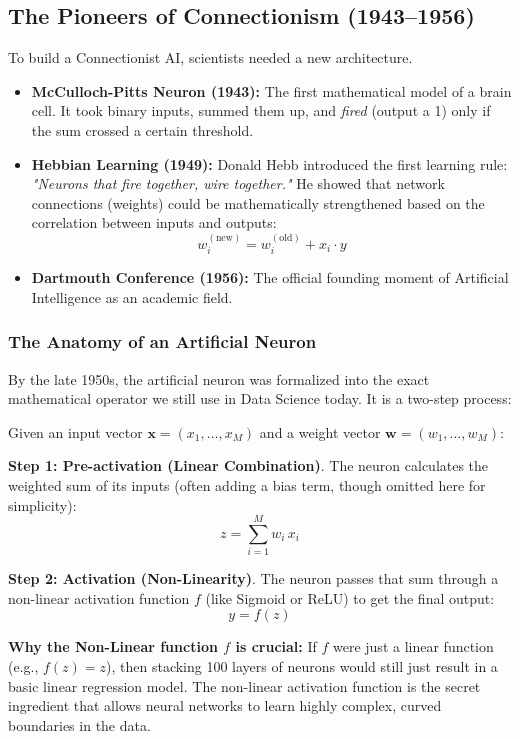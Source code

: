 \documentclass[11pt]{article}
\theoremstyle{smallexample}
\begin{document}
\subsection{The Pioneers of Connectionism (1943--1956)}
To build a Connectionist AI, scientists needed a new architecture.
\begin{itemize}
    \item \textbf{McCulloch-Pitts Neuron (1943):} The first mathematical model of a brain cell. It took binary inputs, summed them up, and \textit{fired} (output a 1) only if the sum crossed a certain threshold.
    \item \textbf{Hebbian Learning (1949):} Donald Hebb introduced the first learning rule: \textit{"Neurons that fire together, wire together."} He showed that network connections (weights) could be mathematically strengthened based on the correlation between inputs and outputs: 
    $$w_i^{(\text{new})} = w_i^{(\text{old})} + x_i \cdot y$$
    \item \textbf{Dartmouth Conference (1956):} The official founding moment of Artificial Intelligence as an academic field.
\end{itemize}

\subsubsection{The Anatomy of an Artificial Neuron}
By the late 1950s, the artificial neuron was formalized into the exact mathematical operator we still use in Data Science today. It is a two-step process:

Given an input vector $\mathbf{x} = (x_1, \dots, x_M)$ and a weight vector $\mathbf{w} = (w_1, \dots, w_M)$:

\textbf{Step 1: Pre-activation (Linear Combination)}.
The neuron calculates the weighted sum of its inputs (often adding a bias term, though omitted here for simplicity):
\begin{equation}
z = \sum_{i=1}^{M} w_i \, x_i
\end{equation}





\textbf{Step 2: Activation (Non-Linearity)}.
The neuron passes that sum through a non-linear activation function $f$ (like Sigmoid or ReLU) to get the final output:
$$y = f(z)$$





\textbf{Why the Non-Linear function $f$ is crucial:} 
If $f$ were just a linear function (e.g., $f(z) = z$), then stacking 100 layers of neurons would still just result in a basic linear regression model. The non-linear activation function is the secret ingredient that allows neural networks to learn highly complex, curved boundaries in the data.
\end{document}
